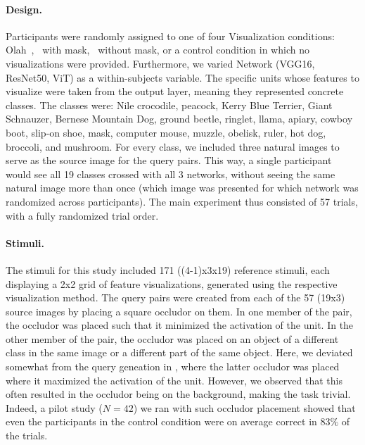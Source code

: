 \paragraph{Design.} Participants were randomly assigned to one of four Visualization conditions: Olah~\cite{olah2017feature}, \magfv~with mask, \magfv~without mask, or a control condition in which no visualizations were provided. Furthermore, we varied Network (VGG16, ResNet50, ViT) as a within-subjects variable. The specific units whose features to visualize were taken from the output layer, meaning they represented concrete classes. The classes were: Nile crocodile, peacock, Kerry Blue Terrier, Giant Schnauzer, Bernese Mountain Dog, ground beetle, ringlet, llama, apiary, cowboy boot, slip-on shoe, mask, computer mouse, muzzle, obelisk, ruler, hot dog, broccoli, and mushroom. For every class, we included three natural images to serve as the source image for the query pairs. This way, a single participant would see all 19 classes crossed with all 3 networks, without seeing the same natural image more than once (which image was presented for which network was randomized across participants). The main experiment thus consisted of 57 trials, with a fully randomized trial order.

\paragraph{Stimuli.} The stimuli for this study included 171 ((4-1)x3x19) reference stimuli, each displaying a 2x2 grid of feature visualizations, generated using the respective visualization method. The query pairs were created from each of the 57 (19x3) source images by placing a square occludor on them. In one member of the pair, the occludor was placed such that it minimized the activation of the unit. In the other member of the pair, the occludor was placed on an object of a different class in the same image or a different part of the same object. Here, we deviated somewhat from the query geneation in \cite{zimmermann2021well}, where the latter occludor was placed where it maximized the activation of the unit. However, we observed that this often resulted in the occludor being on the background, making the task trivial. Indeed, a pilot study ($N=42$) we ran with such occludor placement showed that even the participants in the control condition were on average correct in $83\%$ of the trials. 

